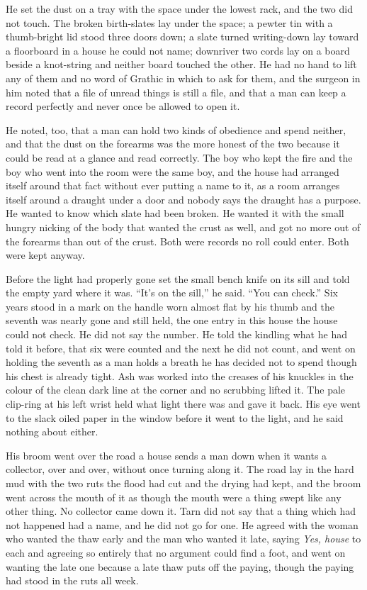 He set the dust on a tray with the space under the lowest rack, and the two did not touch. The broken birth-slates lay under the space; a pewter tin with a thumb-bright lid stood three doors down; a slate turned writing-down lay toward a floorboard in a house he could not name; downriver two cords lay on a board beside a knot-string and neither board touched the other. He had no hand to lift any of them and no word of Grathic in which to ask for them, and the surgeon in him noted that a file of unread things is still a file, and that a man can keep a record perfectly and never once be allowed to open it.

He noted, too, that a man can hold two kinds of obedience and spend neither, and that the dust on the forearms was the more honest of the two because it could be read at a glance and read correctly. The boy who kept the fire and the boy who went into the room were the same boy, and the house had arranged itself around that fact without ever putting a name to it, as a room arranges itself around a draught under a door and nobody says the draught has a purpose. He wanted to know which slate had been broken. He wanted it with the small hungry nicking of the body that wanted the crust as well, and got no more out of the forearms than out of the crust. Both were records no roll could enter. Both were kept anyway.

\scenebreak

Before the light had properly gone  set the small bench knife on its sill and told the empty yard where it was. “It's on the sill,” he said. “You can check.” Six years stood in a mark on the handle worn almost flat by his thumb and the seventh was nearly gone and still held, the one entry in this house the house could not check. He did not say the number. He told the kindling what he had told it before, that six were counted and the next he did not count, and went on holding the seventh as a man holds a breath he has decided not to spend though his chest is already tight. Ash was worked into the creases of his knuckles in the colour of the clean dark line at the corner and no scrubbing lifted it. The pale clip-ring at his left wrist held what light there was and gave it back. His eye went to the slack oiled paper in the window before it went to the light, and he said nothing about either.

His broom went over the road a house sends a man down when it wants a collector, over and over, without once turning along it. The road lay in the hard mud with the two ruts the flood had cut and the drying had kept, and the broom went across the mouth of it as though the mouth were a thing swept like any other thing. No collector came down it. Tarn did not say that a thing which had not happened had a name, and he did not go for one. He agreed with the woman who wanted the thaw early and the man who wanted it late, saying \emph{Yes, house} to each and agreeing so entirely that no argument could find a foot, and went on wanting the late one because a late thaw puts off the paying, though the paying had stood in the ruts all week.

